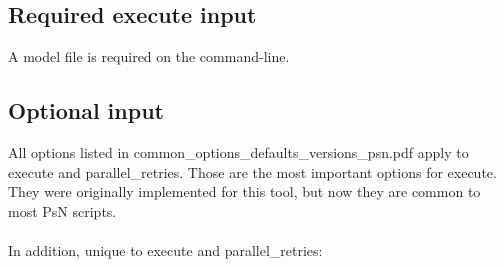 \documentclass[a4paper,12pt]{article}
\begin{document}
\subsection{Required execute input}
A model file is required on the command-line.

\subsection{Optional input}
All options listed in common\_options\_defaults\_versions\_psn.pdf apply to execute and parallel\_retries. Those are the most important options for execute. They were originally implemented for this tool, but now they are common to most PsN scripts.
\\
\\
In addition, unique to execute and parallel\_retries:
\\
\end{document}
